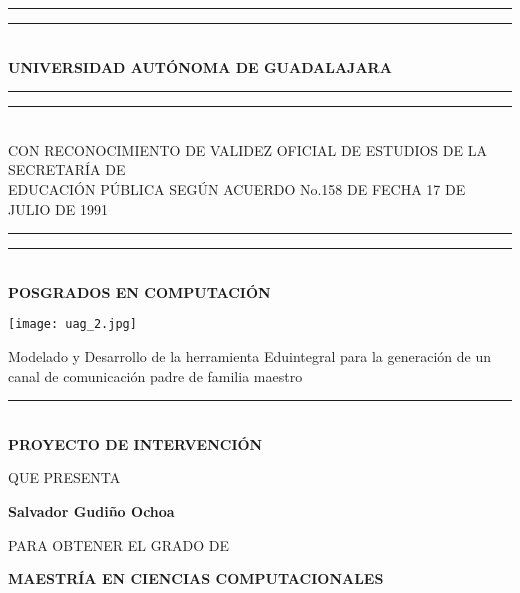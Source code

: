 
\begin{titlepage}
    \begin{center}
        \rule{\textwidth}{4pt}\vspace*{-\baselineskip}\vspace*{2pt} %
        \rule{\textwidth}{1pt}\\[\baselineskip] %
        \textbf{\normalsize UNIVERSIDAD AUTÓNOMA DE GUADALAJARA} %
        \rule{\textwidth}{0.4pt}\vspace*{-\baselineskip}\vspace{3.2pt} %
        \rule{\textwidth}{1.6pt}\\[\baselineskip] %
        
        {\tiny CON RECONOCIMIENTO DE VALIDEZ OFICIAL DE ESTUDIOS DE LA SECRETARÍA DE \\ EDUCACIÓN PÚBLICA SEGÚN ACUERDO No.158 DE FECHA 17 DE JULIO DE 1991} %
        \rule{\textwidth}{0.4pt}\vspace*{-\baselineskip}\vspace{3.2pt} %
        \rule{\textwidth}{1.6pt}\\[\baselineskip] %

        \textbf{\small POSGRADOS EN COMPUTACIÓN} %
        
        \vspace*{1.2cm}
        \texttt{[image: uag\_2.jpg]}
        \vspace*{1.2cm}
        
        {\small Modelado y Desarrollo de la herramienta Eduintegral para la generación de un canal de comunicación padre de familia maestro}
        \rule{\textwidth}{0.6pt}\\[\baselineskip] %
        
        \textbf{\small PROYECTO DE INTERVENCIÓN} %
        \vspace*{1.2cm} 
        
        {\scriptsize QUE PRESENTA}
        
        \textbf{\scriptsize Salvador Gudiño Ochoa }
        \vspace*{1.2cm}
        
        {\scriptsize PARA OBTENER EL GRADO DE}
        
        \textbf{\small MAESTRÍA EN CIENCIAS COMPUTACIONALES} %
        \vspace*{1.2cm}
        

\end{center}
\end{titlepage}

